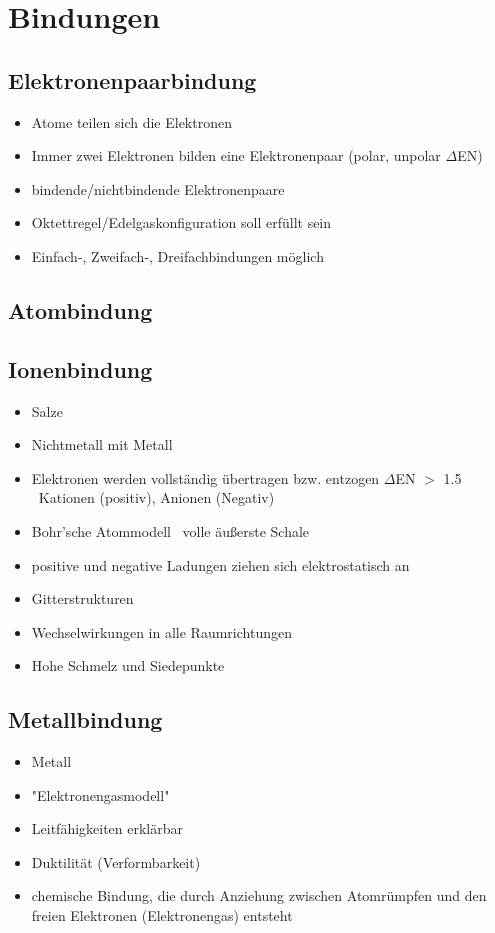 
\section{Bindungen}

\subsection{Elektronenpaarbindung}
\begin{itemize}
    \item Atome teilen sich die Elektronen
    \item Immer zwei Elektronen bilden eine Elektronenpaar (polar, unpolar $\Delta$EN)
    \item bindende/nichtbindende Elektronenpaare
    \item Oktettregel/Edelgaskonfiguration soll erfüllt sein
    \item Einfach-, Zweifach-, Dreifachbindungen möglich
\end{itemize}

\subsection{Atombindung}

\subsection{Ionenbindung}
\begin{itemize}
    \item Salze
    \item Nichtmetall mit Metall
    \item Elektronen werden vollständig übertragen bzw. entzogen $\Delta$EN $>$ 1.5 \\
        \textrightarrow\ Kationen (positiv), Anionen (Negativ)
    \item Bohr'sche Atommodell \textrightarrow\ volle äußerste Schale
    \item positive und negative Ladungen ziehen sich elektrostatisch an
    \item Gitterstrukturen
    \item Wechselwirkungen in alle Raumrichtungen
    \item Hohe Schmelz und Siedepunkte
\end{itemize}

\subsection{Metallbindung}
\begin{itemize}
    \item Metall
    \item "Elektronengasmodell"
    \item Leitfähigkeiten erklärbar
    \item Duktilität (Verformbarkeit)
    \item chemische Bindung, die durch Anziehung zwischen Atomrümpfen und den freien Elektronen (Elektronengas) entsteht
\end{itemize}

